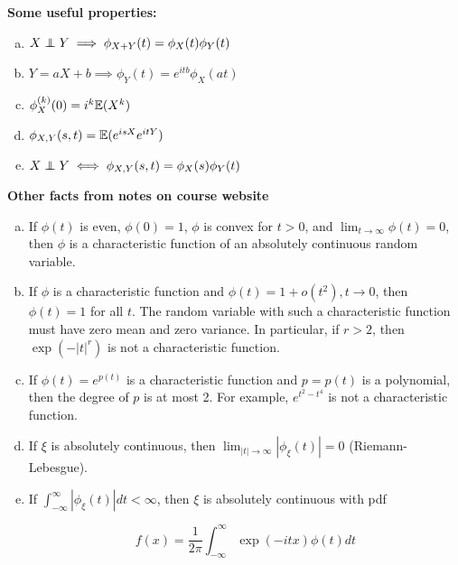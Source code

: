 \begin{theorem}

\textbf{Some useful properties:}

\begin{enumerate}[(a)]

\item \(X \indep Y \implies \phi_{X + Y}(t) = \phi_X(t) \phi_Y(t)\)

\item \(Y = aX + b \implies \phi_Y(t) = e^{itb} \phi_X(at)\)

\item \(\phi_X^{(k)}(0) = i^k \E(X^k)\)

\item \(\phi_{X,Y}(s,t) = \E(e^{isX}e^{itY})\)

\item \(X \indep Y \iff \phi_{X,Y}(s,t) = \phi_X(s) \phi_Y(t)\)

\end{enumerate}

\end{theorem}

\begin{theorem}

\textbf{Other facts from notes on course website}

\begin{enumerate}[(a)]

\item If \(\phi(t)\) is even, \(\phi(0) = 1\), \(\phi\) is convex for \(t > 0\), and \(\lim_{t \to \infty} \phi(t) = 0\), then \(\phi\) is a characteristic function of an absolutely continuous random variable.

\item If \(\phi\) is a characteristic function and \(\phi(t) = 1 + o(t^2), t \to 0\), then \(\phi(t) = 1\) for all \(t\). The random variable with such a characteristic function must have zero mean and zero variance. In particular, if \(r > 2\), then \(\exp(-\left|t\right|^r)\) is not a characteristic function.

\item If \(\phi(t) = e^{p(t)}\) is a characteristic function and \(p = p(t)\) is a polynomial, then the degree of \(p\) is at most 2. For example, \(e^{t^2 - t^4}\) is not a characteristic function.

\item If \(\xi\) is absolutely continuous, then \(\lim_{\left|t \right| \to \infty} \left| \phi_{\xi}(t) \right| = 0\) (Riemann-Lebesgue).

\item If \(\int_{-\infty}^\infty \left| \phi_{\xi}(t) \right| dt < \infty\), then \(\xi\) is absolutely continuous with pdf 

\[
f(x) = \frac{1}{2\pi} \int_{-\infty}^\infty \exp(-itx) \phi(t) dt
\]

\end{enumerate}
\end{theorem}

